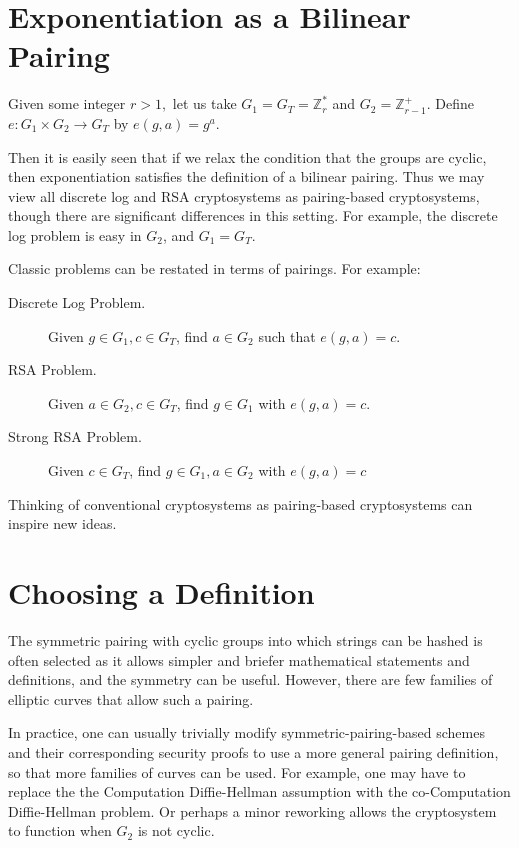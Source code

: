 \section{Exponentiation as a Bilinear Pairing}

Given some integer $r > 1,$
let us take $G_1 = G_T = \mathbb{Z}_r^*$ and $G_2 = \mathbb{Z}_{r-1}^+$.
Define $e:G_1\times G_2 \rightarrow G_T$ by $e(g, a)= g^a$.

Then it is easily seen that if we relax the condition that the groups
are cyclic, then exponentiation satisfies the definition of a bilinear pairing.
Thus we may view all discrete log and RSA cryptosystems
as pairing-based cryptosystems, though there are significant differences
in this setting. For example, the discrete log problem is easy
in $G_2$, and $G_1 = G_T$.

Classic problems can be restated in terms of
pairings. For example:

\begin{description}
\item[Discrete Log Problem.]
Given $g \in G_1, c \in G_T$, find $a \in G_2$ such that $e(g,a) = c$.
\item[RSA Problem.]
Given $a \in G_2, c \in G_T$, find $g \in G_1$ with
$e(g,a) = c$.
\item[Strong RSA Problem.]
Given $c \in G_T$, find $g \in G_1, a\in G_2$ with
$e(g,a) = c$
\end{description}

Thinking of conventional cryptosystems as pairing-based cryptosystems
can inspire new ideas.

\section{Choosing a Definition}

The symmetric pairing with cyclic groups into which strings can be hashed
is often selected
as it allows simpler and briefer mathematical statements and definitions,
and the symmetry can be useful.
However, there are few families of elliptic curves that allow such a pairing.

In practice, one can usually trivially modify symmetric-pairing-based schemes
and their corresponding
security proofs to use a more general pairing definition,
so that more families of curves can be used.
For example, one may have to replace the
the Computation Diffie-Hellman assumption with
the co-Computation Diffie-Hellman problem. Or perhaps
a minor reworking allows the cryptosystem to function when $G_2$
is not cyclic.

